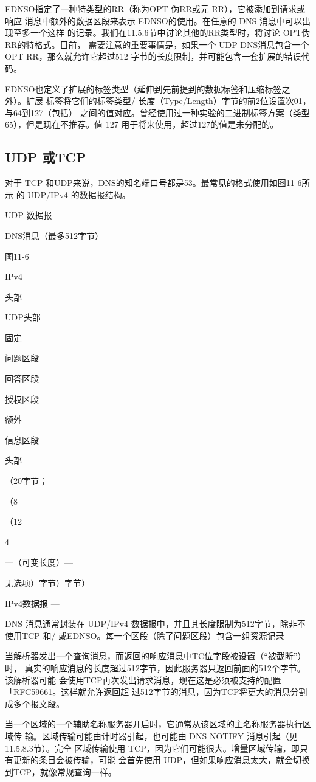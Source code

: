 EDNSO指定了一种特类型的RR（称为OPT 伪RR或元 RR），它被添加到请求或响应
消息中额外的数据区段来表示 EDNSO的使用。在任意的 DNS 消息中可以出现至多一个这样
的记录。我们在11.5.6节中讨论其他的RR类型时，将讨论 OPT伪 RR的特格式。目前，
需要注意的重要事情是，如果一个 UDP DNS消息包含一个 OPT RR，那么就允许它超过512
字节的长度限制，并可能包含一套扩展的错误代码。

EDNSO也定义了扩展的标签类型（延伸到先前提到的数据标签和压缩标签之外）。扩展
标签将它们的标签类型/ 长度（Type/Length）字节的前2位设置次01，与64到127（包括）
之间的值对应。曾经使用过一种实验的二进制标签方案（类型65），但是现在不推荐。值
127 用于将来使用，超过127的值是未分配的。

\subsection{UDP 或TCP}

对于 TCP 和UDP来说，DNS的知名端口号都是53。最常见的格式使用如图11-6所示
的 UDP/IPv4 的数据报结构。

UDP 数据报

DNS消息（最多512字节）

图11-6

IPv4

头部

UDP头部

固定

问题区段

回答区段

授权区段

额外

信息区段

头部

（20字节；

（8

（12

4

一（可变长度）—

无选项）字节）字节）

IPv4数据报 —

DNS 消息通常封装在 UDP/IPv4 数据报中，并且其长度限制为512字节，除非不使用TCP 和/
或EDNSO。每一个区段（除了问题区段）包含一组资源记录

当解析器发出一个查询消息，而返回的响应消息中TC位字段被设置（“被截断”）时，
真实的响应消息的长度超过512字节，因此服务器只返回前面的512个字节。该解析器可能
会使用TCP再次发出请求消息，现在这是必须被支持的配置「RFC59661。这样就允许返回超
过512字节的消息，因为TCP将更大的消息分割成多个报文段。

当一个区域的一个辅助名称服务器开启时，它通常从该区域的主名称服务器执行区域传
输。区域传输可能由计时器引起，也可能由 DNS NOTIFY 消息引起（见11.5.8.3节）。完全
区域传输使用 TCP，因为它们可能很大。增量区域传输，即只有更新的条目会被传输，可能
会首先使用 UDP，但如果响应消息太大，就会切换到TCP，就像常规查询一样。

